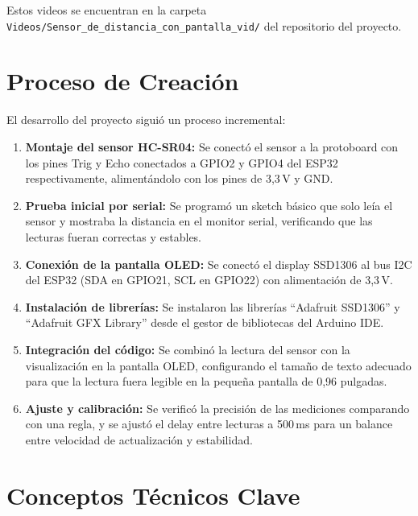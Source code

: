 \documentclass[12pt,a4paper]{article}
\begin{document}
Estos videos se encuentran en la carpeta \texttt{Videos/Sensor\_de\_distancia\_con\_pantalla\_vid/} del repositorio del proyecto.

\section{Proceso de Creación}

El desarrollo del proyecto siguió un proceso incremental:

\begin{enumerate}
    \item \textbf{Montaje del sensor HC-SR04:} Se conectó el sensor a la protoboard con los pines Trig y Echo conectados a GPIO2 y GPIO4 del ESP32 respectivamente, alimentándolo con los pines de 3,3\,V y GND.
    
    \item \textbf{Prueba inicial por serial:} Se programó un sketch básico que solo leía el sensor y mostraba la distancia en el monitor serial, verificando que las lecturas fueran correctas y estables.
    
    \item \textbf{Conexión de la pantalla OLED:} Se conectó el display SSD1306 al bus I2C del ESP32 (SDA en GPIO21, SCL en GPIO22) con alimentación de 3,3\,V.
    
    \item \textbf{Instalación de librerías:} Se instalaron las librerías ``Adafruit SSD1306'' y ``Adafruit GFX Library'' desde el gestor de bibliotecas del Arduino IDE.
    
    \item \textbf{Integración del código:} Se combinó la lectura del sensor con la visualización en la pantalla OLED, configurando el tamaño de texto adecuado para que la lectura fuera legible en la pequeña pantalla de 0,96 pulgadas.
    
    \item \textbf{Ajuste y calibración:} Se verificó la precisión de las mediciones comparando con una regla, y se ajustó el delay entre lecturas a 500\,ms para un balance entre velocidad de actualización y estabilidad.
\end{enumerate}

\section{Conceptos Técnicos Clave}
\end{document}
